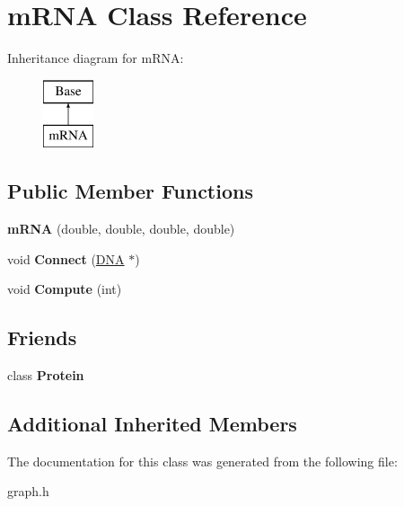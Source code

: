 \hypertarget{classm_r_n_a}{\section{m\-R\-N\-A Class Reference}
\label{classm_r_n_a}
}
Inheritance diagram for m\-R\-N\-A\-:\begin{figure}[H]
\begin{center}
\leavevmode
\includegraphics[height=2.000000cm]{classm_r_n_a}
\end{center}
\end{figure}
\subsection*{Public Member Functions}
\begin{DoxyCompactItemize}
\item 
\hypertarget{classm_r_n_a_a1fc26dc1fe542e23f9d374533600b9fb}{{\bfseries m\-R\-N\-A} (double, double, double, double)}\label{classm_r_n_a_a1fc26dc1fe542e23f9d374533600b9fb}

\item 
\hypertarget{classm_r_n_a_ac010324e6b1dc61fb8e1391b219acb2c}{void {\bfseries Connect} (\hyperlink{class_d_n_a}{D\-N\-A} $\ast$)}\label{classm_r_n_a_ac010324e6b1dc61fb8e1391b219acb2c}

\item 
\hypertarget{classm_r_n_a_a490f8026d612c405ce2678a4d15cf7a8}{void {\bfseries Compute} (int)}\label{classm_r_n_a_a490f8026d612c405ce2678a4d15cf7a8}

\end{DoxyCompactItemize}
\subsection*{Friends}
\begin{DoxyCompactItemize}
\item 
\hypertarget{classm_r_n_a_a2cc8b86817f46f61585ecf591984f8eb}{class {\bfseries Protein}}\label{classm_r_n_a_a2cc8b86817f46f61585ecf591984f8eb}

\end{DoxyCompactItemize}
\subsection*{Additional Inherited Members}


The documentation for this class was generated from the following file\-:\begin{DoxyCompactItemize}
\item 
graph.\-h\end{DoxyCompactItemize}
